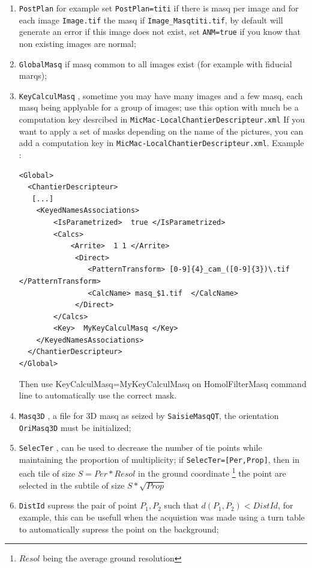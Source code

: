 \begin{enumerate}
    \item {\tt PostPlan} for example set {\tt PostPlan=titi} if there is masq per image and for each image 
          {\tt Image.tif} the masq if {\tt Image\_Masqtiti.tif}, by default will generate an error if this
          image does not exist, set {\tt ANM=true} if you know that non existing images are normal;

    \item {\tt GlobalMasq} if masq common to all images exist (for example with fiducial marqs);

    \item {\tt KeyCalculMasq} , sometime you may have many images and a few masq, each masq being applyable
          for a group of images; use this option with much be a computation key desrcibed in
          {\tt MicMac-LocalChantierDescripteur.xml}
          If you want to apply a set of masks depending on the name of the pictures, you can add a computation key in
          {\tt MicMac-LocalChantierDescripteur.xml}. Example :
          \begin{verbatim}
<Global>
  <ChantierDescripteur>
   [...]
    <KeyedNamesAssociations>
        <IsParametrized>  true </IsParametrized>
        <Calcs>
            <Arrite>  1 1 </Arrite>
             <Direct>
                <PatternTransform> [0-9]{4}_cam_([0-9]{3})\.tif   </PatternTransform>
                <CalcName> masq_$1.tif  </CalcName>
             </Direct>
        </Calcs>
        <Key>  MyKeyCalculMasq </Key>
    </KeyedNamesAssociations>
  </ChantierDescripteur>
</Global>
          \end{verbatim}
          Then use KeyCalculMasq=MyKeyCalculMasq on HomolFilterMasq command line to automatically use the correct mask.

    \item {\tt Masq3D} , a file for 3D masq as seized by {\tt SaisieMasqQT}, the orientation {\tt OriMasq3D} 
          must be initialized;

    \item {\tt SelecTer} , can be used to decrease the number of tie points while maintaining the proportion
          of multiplicity;  if {\tt SelecTer=[Per,Prop]}, then in each tile of size $S=Per*Resol$  in the ground coordinate
          \footnote{$Resol$ being the average ground resolution} the point are selected in the subtile of 
          size $S * \sqrt{Prop}$
    
    \item {\tt DistId} supress the pair of point $P_1,P_2$ such that $d(P_1,P_2)<DistId$, for example,
          this can be usefull when the acquistion was made using a turn table to automatically supress the
          point on the background;
    
\end{enumerate}



